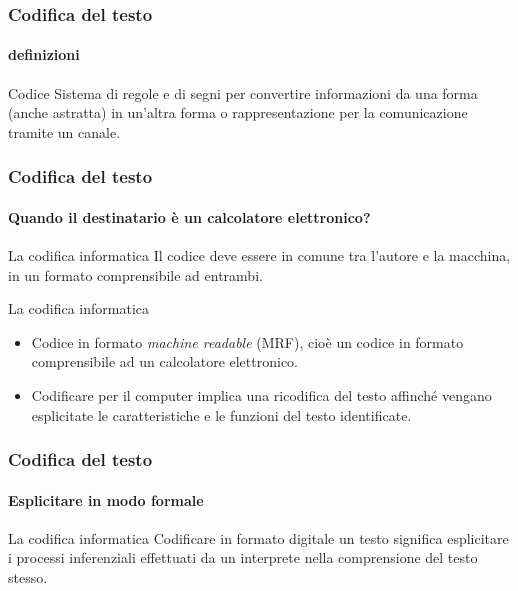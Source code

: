 \begin{frame}
	\frametitle{Codifica del testo}
	\framesubtitle{definizioni}
	\addtocounter{nframe}{1}

	\begin{block}{Codice}
		Sistema di regole e di segni per convertire informazioni da una forma (anche astratta) in un'altra forma o rappresentazione per la comunicazione tramite un canale.
	\end{block}

\end{frame}

\begin{frame}
	\frametitle{Codifica del testo}
	\framesubtitle{Quando il destinatario è un calcolatore elettronico?}
	\addtocounter{nframe}{1}

	\begin{block}{La codifica informatica}
		Il codice deve essere in comune tra l'autore e la macchina, in un formato comprensibile ad entrambi.
	\end{block}

	\begin{block}{La codifica informatica}
		\begin{itemize}
			\item Codice in formato \textit{machine readable} (MRF), cioè un codice in formato comprensibile ad un calcolatore elettronico.
			\item Codificare per il computer implica una ricodifica del testo affinché vengano esplicitate le caratteristiche e le funzioni del testo identificate.
		\end{itemize}
	\end{block}

\end{frame}

\begin{frame}
	\frametitle{Codifica del testo}
	\framesubtitle{Esplicitare in modo formale}
	\addtocounter{nframe}{1}

	\begin{block}{La codifica informatica}
		Codificare in formato digitale un testo significa esplicitare i processi inferenziali effettuati da un interprete nella comprensione del testo stesso.
	\end{block}


\end{frame}


